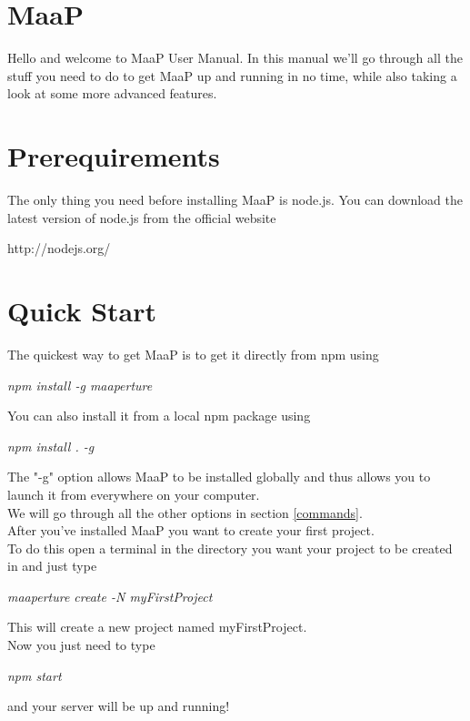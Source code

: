 \newpage
\section{MaaP}
Hello and welcome to MaaP User Manual.
In this manual we'll go through all the stuff you need to do to get MaaP up and running in no time, while also taking a look at some more advanced features.

\section{Prerequirements}
The only thing you need before installing MaaP is node.js.
You can download the latest version of node.js from the official website
\begin{center}
http://nodejs.org/
\end{center}

\section{Quick Start}
The quickest way to get MaaP is to get it directly from npm using
\begin{center}
\textit{npm install -g maaperture}
\end{center}

You can also install it from a local npm package using 
\begin{center}
\textit{npm install . -g}
\end{center}

The "-g" option allows MaaP to be installed globally and thus allows you to launch it from everywhere on your computer.\\
We will go through all the other options in section \ref{commands}.\\

After you've installed MaaP you want to create your first project.\\
To do this open a terminal in the directory you want your project to be created in and just type
\begin{center}
\textit{ maaperture create -N myFirstProject}
\end{center}

This will create a new project named myFirstProject.\\
Now you just need to type
\begin{center}
\textit{npm start}
\end{center}

and your server will be up and running!\\

